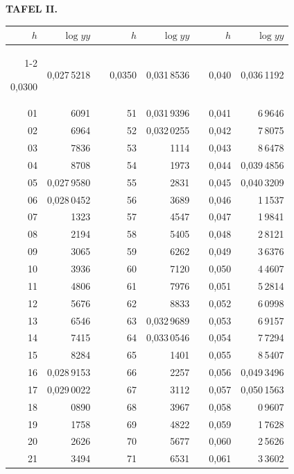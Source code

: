\endgroup
\clearpage
{}
\begingroup
\centering
\fontsize{9}{9}\selectfont
\setlength{\tabcolsep}{8pt}
\renewcommand{\arraystretch}{1}
\setlength{\parskip}{0pt}
\textbf{TAFEL II.}
\par\vspace{7pt}
\begin{tabular}{|r|r|@{}p{9pt}@{}|r|r|@{}p{9pt}@{}|r|r|}
\hline
\rule{0pt}{8.5pt}\(h\) & \(\log yy\) & & \(h\) & \(\log yy\) & & \(h\) & \(\log yy\) \\
\cline{1-2}\cline{4-5}\cline{7-8}
\rule{0pt}{8.5pt}0,0300 & 0,027\,5218 &  & 0,0350 & 0,031\,8536 &  & 0,040 & 0,036\,1192 \\
01 & 6091 &  & 51 & 0,031\,9396 &  & 0,041 & 6\,9646 \\
02 & 6964 &  & 52 & 0,032\,0255 &  & 0,042 & 7\,8075 \\
03 & 7836 &  & 53 & 1114 &  & 0,043 & 8\,6478 \\
04 & 8708 &  & 54 & 1973 &  & 0,044 & 0,039\,4856 \\
05 & 0,027\,9580 &  & 55 & 2831 &  & 0,045 & 0,040\,3209 \\[3pt]
06 & 0,028\,0452 &  & 56 & 3689 &  & 0,046 & 1\,1537 \\
07 & 1323 &  & 57 & 4547 &  & 0,047 & 1\,9841 \\
08 & 2194 &  & 58 & 5405 &  & 0,048 & 2\,8121 \\
09 & 3065 &  & 59 & 6262 &  & 0,049 & 3\,6376 \\
10 & 3936 &  & 60 & 7120 &  & 0,050 & 4\,4607 \\[3pt]
11 & 4806 &  & 61 & 7976 &  & 0,051 & 5\,2814 \\
12 & 5676 &  & 62 & 8833 &  & 0,052 & 6\,0998 \\
13 & 6546 &  & 63 & 0,032\,9689 &  & 0,053 & 6\,9157 \\
14 & 7415 &  & 64 & 0,033\,0546 &  & 0,054 & 7\,7294 \\
15 & 8284 &  & 65 & 1401 &  & 0,055 & 8\,5407 \\[3pt]
16 & 0,028\,9153 &  & 66 & 2257 &  & 0,056 & 0,049\,3496 \\
17 & 0,029\,0022 &  & 67 & 3112 &  & 0,057 & 0,050\,1563 \\
18 & 0890 &  & 68 & 3967 &  & 0,058 & 0\,9607 \\
19 & 1758 &  & 69 & 4822 &  & 0,059 & 1\,7628 \\
20 & 2626 &  & 70 & 5677 &  & 0,060 & 2\,5626 \\[3pt]
21 & 3494 &  & 71 & 6531 &  & 0,061 & 3\,3602 \\

\end{tabular}
